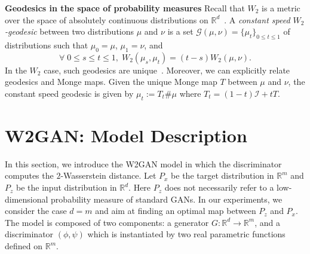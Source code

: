 \documentclass[runningheads]{llncs}
\newcommand{\id}{\mathcal{I}}
\begin{document}
\noindent \textbf{Geodesics in the space of probability measures}
\label{sec:geodesics_W_2}
Recall that $W_2$ is a metric over the space of absolutely continuous distributions on $\mathds{R}^d$~\citep{Villani}. A \textit{constant speed $W_2$-geodesic} between two distributions $\mu$ and  $\nu$ is a set $\mathcal{G}(\mu,\nu)=\{\mu_t\}_{0\leqslant t \leqslant 1}$ of distributions such that $\mu_0=\mu$, $\mu_1=\nu$, and
\begin{equation}
   \forall \; 0\leqslant s \leqslant t\leqslant1, \; W_2(\mu_s,\mu_t)=(t-s)W_2(\mu,\nu). 
\end{equation}
In the $W_2$ case, such geodesics are unique~\citep{Villani}. %
Moreover, we can explicitly relate geodesics and Monge maps. Given the unique Monge map $T$ between $\mu$ and $\nu$, the constant speed geodesic is given by $\mu_t:=T_t\#\mu$ where $T_t=(1-t)\id+tT$. 


\section{W2GAN: Model Description}
In this section, we introduce the W2GAN model in which the discriminator computes the $2$-Wasserstein distance.
Let $P_x$ be the target distribution in $\mathds{R}^m$ and $P_z$ be the input distribution in $\mathds{R}^d$. Here $P_z$ does not necessarily refer to a low-dimensional probability measure of standard GANs. In our experiments, we consider the case $d=m$ and aim at finding an optimal map between $P_z$ and $P_x$. The model is composed of two components: a generator $G:\mathds{R}^d\rightarrow \mathds{R}^m$, and a discriminator $(\phi,\psi)$ which is instantiated by two real parametric functions defined on $\mathds{R}^m$.
\end{document}
